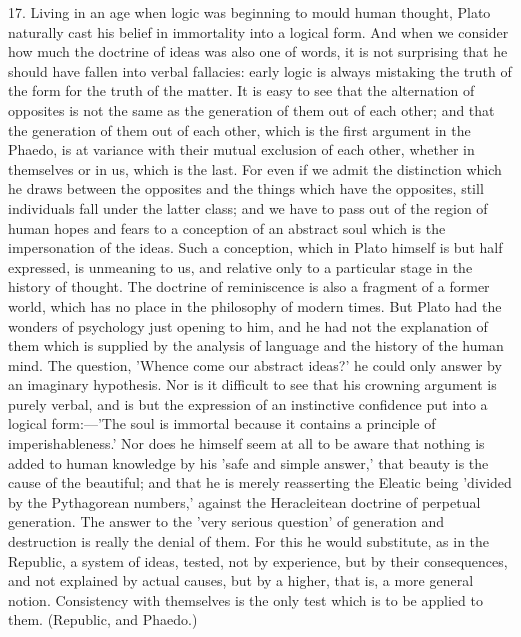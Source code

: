 \documentclass[11pt,letter]{article}
\begin{document}
\par  17. Living in an age when logic was beginning to mould human thought, Plato naturally cast his belief in immortality into a logical form. And when we consider how much the doctrine of ideas was also one of words, it is not surprising that he should have fallen into verbal fallacies: early logic is always mistaking the truth of the form for the truth of the matter. It is easy to see that the alternation of opposites is not the same as the generation of them out of each other; and that the generation of them out of each other, which is the first argument in the Phaedo, is at variance with their mutual exclusion of each other, whether in themselves or in us, which is the last. For even if we admit the distinction which he draws between the opposites and the things which have the opposites, still individuals fall under the latter class; and we have to pass out of the region of human hopes and fears to a conception of an abstract soul which is the impersonation of the ideas. Such a conception, which in Plato himself is but half expressed, is unmeaning to us, and relative only to a particular stage in the history of thought. The doctrine of reminiscence is also a fragment of a former world, which has no place in the philosophy of modern times. But Plato had the wonders of psychology just opening to him, and he had not the explanation of them which is supplied by the analysis of language and the history of the human mind. The question, 'Whence come our abstract ideas?' he could only answer by an imaginary hypothesis. Nor is it difficult to see that his crowning argument is purely verbal, and is but the expression of an instinctive confidence put into a logical form:—'The soul is immortal because it contains a principle of imperishableness.' Nor does he himself seem at all to be aware that nothing is added to human knowledge by his 'safe and simple answer,' that beauty is the cause of the beautiful; and that he is merely reasserting the Eleatic being 'divided by the Pythagorean numbers,' against the Heracleitean doctrine of perpetual generation. The answer to the 'very serious question' of generation and destruction is really the denial of them. For this he would substitute, as in the Republic, a system of ideas, tested, not by experience, but by their consequences, and not explained by actual causes, but by a higher, that is, a more general notion. Consistency with themselves is the only test which is to be applied to them. (Republic, and Phaedo.)
\end{document}
